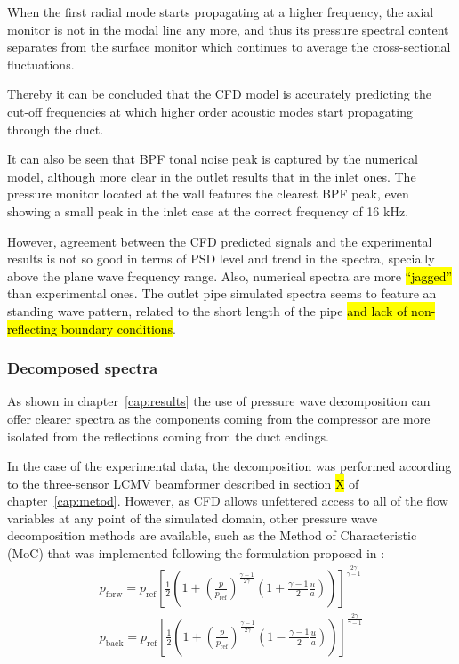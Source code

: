 When the first radial mode starts propagating at a higher frequency, the axial monitor is not in the modal line any more, and thus its pressure spectral content separates from the surface monitor which continues to average the cross-sectional fluctuations.

Thereby it can be concluded that the CFD model is accurately predicting the cut-off frequencies at which higher order acoustic modes start propagating through the duct.

It can also be seen that BPF tonal noise peak is captured by the numerical model, although more clear in the outlet results that in the inlet ones. The pressure monitor located at the wall features the clearest BPF peak, even showing a small peak in the inlet case at the correct frequency of 16 kHz.

However, agreement between the CFD predicted signals and the experimental results is not so good in terms of PSD level and trend in the spectra, specially above the plane wave frequency range. Also, numerical spectra are more \hl{``jagged''} than experimental ones. The outlet pipe simulated spectra seems to feature an standing wave pattern, related to the short length of the pipe \hl{and lack of non-reflecting boundary conditions}.

\subsubsection{Decomposed spectra}

As shown in chapter~\ref{cap:results} the use of pressure wave decomposition can offer clearer spectra as the components coming from the compressor are more isolated from the reflections coming from the duct endings. 

In the case of the experimental data, the decomposition was performed according to the three-sensor LCMV beamformer described in section \hl{X} of chapter~\ref{cap:metod}. However, as CFD allows unfettered access to all of the flow variables at any point of the simulated domain, other pressure wave decomposition methods are available, such as the Method of Characteristic (MoC) that was implemented following the formulation proposed in \cite{payri1995acoustic,torregrosa2012development,galindo2010coupling}: 
\begin{eqnarray}\label{eq:descomposicion}
p_\text{forw}=p_\text{ref}\left[ \frac{1}{2}\left(1+\left(\frac{p}{p_\text{ref}}\right)^{\frac{\gamma-1}{2\gamma}}\left(1+\frac{\gamma-1}{2}\frac{u}{a}\right)\right) \right]^{\frac{2\gamma}{\gamma-1}}\\
p_\text{back}=p_\text{ref}\left[ \frac{1}{2}\left(1+\left(\frac{p}{p_\text{ref}}\right)^{\frac{\gamma-1}{2\gamma}}\left(1-\frac{\gamma-1}{2}\frac{u}{a}\right)\right) \right]^{\frac{2\gamma}{\gamma-1}}\nonumber
\end{eqnarray}


